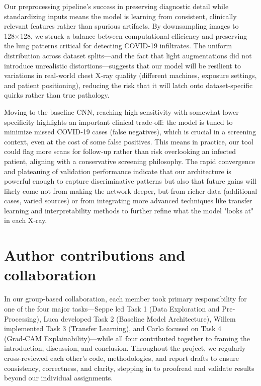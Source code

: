 \documentclass[conference]{IEEEtran}
\begin{document}
Our preprocessing pipeline’s success in preserving diagnostic detail while standardizing inputs means the model is learning from consistent, clinically relevant features rather than spurious artifacts. By downsampling images to 128×128, we struck a balance between computational efficiency and preserving the lung patterns critical for detecting COVID‑19 infiltrates. The uniform distribution across dataset splits—and the fact that light augmentations did not introduce unrealistic distortions—suggests that our model will be resilient to variations in real‑world chest X‑ray quality (different machines, exposure settings, and patient positioning), reducing the risk that it will latch onto dataset‐specific quirks rather than true pathology.

Moving to the baseline CNN, reaching high sensitivity with somewhat lower specificity highlights an important clinical trade‑off: the model is tuned to minimize missed COVID‑19 cases (false negatives), which is crucial in a screening context, even at the cost of some false positives. This means in practice, our tool could flag more scans for follow‑up rather than risk overlooking an infected patient, aligning with a conservative screening philosophy. The rapid convergence and plateauing of validation performance indicate that our architecture is powerful enough to capture discriminative patterns but also that future gains will likely come not from making the network deeper, but from richer data (additional cases, varied sources) or from integrating more advanced techniques like transfer learning and interpretability methods to further refine what the model "looks at" in each X‑ray.

\section{Author contributions and collaboration}

In our group‐based collaboration, each member took primary responsibility for one of the four major tasks—Seppe led Task 1 (Data Exploration and Pre‐Processing), Luca developed Task 2 (Baseline Model Architecture), Willem implemented Task 3 (Transfer Learning), and Carlo focused on Task 4 (Grad‑CAM Explainability)—while all four contributed together to framing the introduction, discussion, and conclusion. Throughout the project, we regularly cross‐reviewed each other’s code, methodologies, and report drafts to ensure consistency, correctness, and clarity, stepping in to proofread and validate results beyond our individual assignments.
\end{document}
